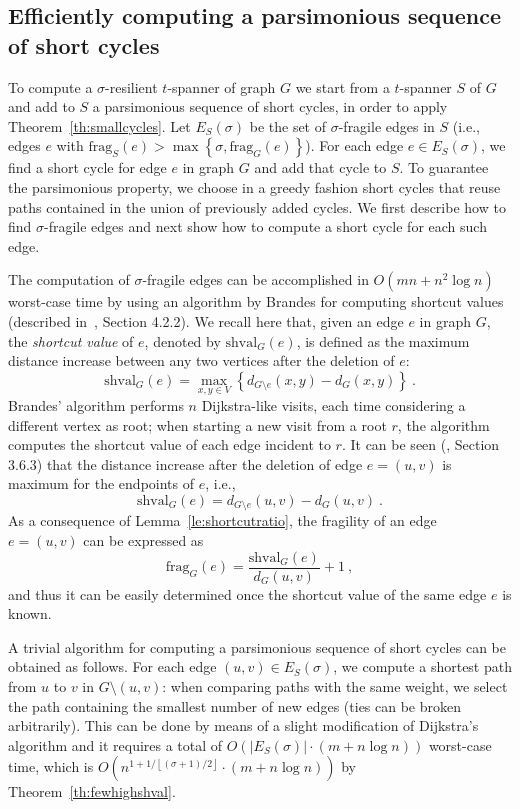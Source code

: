 \documentclass{article}
\newcommand{\dist}          {d}
\newcommand{\shval}          {\mathrm{shval}}
\newcommand{\frag}          {\mathrm{frag}}
\newcommand{\floor}[1]       {\left\lfloor #1 \right\rfloor}
\newcommand{\round}[1]       {\left( #1 \right)}
\newcommand{\braces}[1]       {\left\{ #1 \right\}}
\begin{document}
\subsection{Efficiently computing a parsimonious sequence of short cycles}\label{se:computing}

To compute a $\sigma$-resilient $t$-spanner of graph $G$ we start from a $t$-spanner $S$ of $G$ and add to $S$ a parsimonious sequence of short cycles, in order to apply Theorem~\ref{th:smallcycles}.
Let $E_S(\sigma)$ be the set of $\sigma$-fragile edges in $S$ (i.e., edges $e$ with $\frag_S(e) > \max\braces{\sigma, \frag_G(e)}$).
For each edge $e \in E_S(\sigma)$, we find a short cycle for edge $e$ in graph $G$ and add that cycle to $S$. 
To guarantee the parsimonious property, we 
choose in a greedy fashion short cycles that reuse paths contained in the union of previously added cycles.
We first describe how to find $\sigma$-fragile edges and next show how to compute a short cycle for each such edge.

The computation of $\sigma$-fragile edges can be accomplished in $O(m n + n^2 \log n)$ worst-case time by using an algorithm by Brandes for computing shortcut values (described in~\cite{Dagstuhl4}, Section 4.2.2). 
We recall here that, given an edge $e$ in graph $G$,  
 the \emph{shortcut value} of $e$, denoted by $\shval_G(e)$, is defined as the maximum distance increase between any two vertices after the deletion of $e$:
$$\shval_G(e) = \max_{x,y \in V}\braces{\dist_{G\setminus e}(x,y) - \dist_{G}(x,y)}\ .$$
Brandes' algorithm performs $n$ Dijkstra-like visits,  each time considering a different vertex as root; when starting a new visit from a root $r$, the algorithm computes the shortcut value of each edge incident to $r$.
It can be seen (\cite{Dagstuhl3}, Section 3.6.3) that the distance increase after the deletion of edge $e=(u,v)$ is maximum for the endpoints of $e$, i.e.,
$$\shval_G(e) = \dist_{G\setminus e}(u,v) - \dist_{G}(u,v)\ .$$
As a consequence of Lemma~\ref{le:shortcutratio}, the fragility of an edge $e=(u,v)$ can be expressed as
$$\frag_{G}(e) = \frac{\shval_G(e)}{\dist_G(u,v)} + 1\ ,$$
and thus it can be easily determined once the shortcut value of the same edge $e$ is known.

A trivial algorithm for computing a parsimonious sequence of short cycles can be obtained as follows. For each edge $(u,v) \in E_{S}(\sigma)$, we compute a shortest path from $u$ to $v$ in $G\setminus (u,v)$: when comparing paths with the same weight, we select the path containing the smallest number of new edges (ties can be broken arbitrarily). This can be done by means of a slight modification of Dijkstra's algorithm and it requires a total of $O\round{|E_{S}(\sigma)| \cdot (m + n \log n)}$ worst-case time, which is  
$O\round{n^{1+1/\floor{(\sigma+1)/2}} \cdot (m + n \log n)}$ by Theorem~\ref{th:fewhighshval}.
\end{document}

